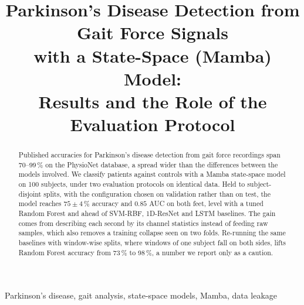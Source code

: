 \documentclass{article}
\title{Parkinson's Disease Detection from Gait Force Signals\\ with a State-Space (Mamba) Model:\\ Results and the Role of the Evaluation Protocol}
\begin{document}
\ninept
\maketitle

\begin{abstract}
Published accuracies for Parkinson's disease detection from gait force
recordings span 70--99\,\% on the PhysioNet database, a spread wider than the
differences between the models involved. We classify patients against controls
with a Mamba state-space model on 100 subjects, under two evaluation protocols
on identical data. Held to subject-disjoint splits, with the configuration
chosen on validation rather than on test, the model reaches $75 \pm 4$\,\%
accuracy and $0.85$ AUC on both feet, level with a tuned Random Forest and
ahead of SVM-RBF, 1D-ResNet and LSTM baselines. The gain comes from describing
each second by its channel statistics instead of feeding raw samples, which
also removes a training collapse seen on two folds. Re-running the same
baselines with window-wise splits, where windows of one subject fall on both
sides, lifts Random Forest accuracy from 73\,\% to 98\,\%, a number we
report only as a caution.
\end{abstract}

\begin{keywords}
Parkinson's disease, gait analysis, state-space models, Mamba, data leakage
\end{keywords}









\end{document}
